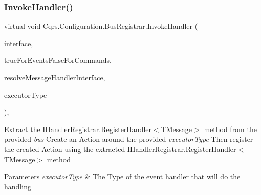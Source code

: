 \mbox{\label{classCqrs_1_1Configuration_1_1BusRegistrar_a159eba5ece9015165be70676a52d8127}} 
\subsubsection{\texorpdfstring{Invoke\+Handler()}{InvokeHandler()}}
{\footnotesize\ttfamily virtual void Cqrs.\+Configuration.\+Bus\+Registrar.\+Invoke\+Handler (\begin{DoxyParamCaption}\item[{Type @}]{interface,  }\item[{bool}]{true\+For\+Events\+False\+For\+Commands,  }\item[{Func$<$ Type, I\+Enumerable$<$ Type $>$$>$}]{resolve\+Message\+Handler\+Interface,  }\item[{Type}]{executor\+Type }\end{DoxyParamCaption})\hspace{0.3cm}{\ttfamily [protected]}, {\ttfamily [virtual]}}



Extract the I\+Handler\+Registrar.\+Register\+Handler$<$\+T\+Message$>$ method from the provided {\itshape bus}  Create an Action around the provided {\itshape executor\+Type}  Then register the created Action using the extracted I\+Handler\+Registrar.\+Register\+Handler$<$\+T\+Message$>$ method 


\begin{DoxyParams}{Parameters}
{\em executor\+Type} & The Type of the event handler that will do the handling\\
\hline
\end{DoxyParams}
\mbox{\label{classCqrs_1_1Configuration_1_1BusRegistrar_a3103da4cf077104607fe03a862958827}} 
